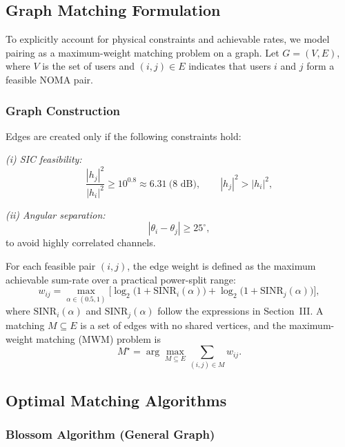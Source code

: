 \subsection{Graph Matching Formulation}

To explicitly account for physical constraints and achievable rates, we model pairing as a maximum-weight matching problem on a graph. Let $G=(V,E)$, where $V$ is the set of users and $(i,j)\in E$ indicates that users $i$ and $j$ form a feasible NOMA pair.

\subsubsection{Graph Construction}

Edges are created only if the following constraints hold:

\textit{(i) SIC feasibility:}
\begin{equation}
\frac{|h_j|^2}{|h_i|^2} \ge 10^{0.8} \approx 6.31 \ \text{(8 dB)}, 
\qquad |h_j|^2 > |h_i|^2 ,
\end{equation}

\textit{(ii) Angular separation:}
\begin{equation}
|\theta_i - \theta_j| \ge 25^\circ,
\end{equation}
to avoid highly correlated channels.

For each feasible pair $(i,j)$, the edge weight is defined as the maximum achievable sum-rate over a practical power-split range:
\begin{equation}
\label{eq:edge_weight}
w_{ij} = \max_{\alpha \in (0.5,1)} 
\Big[
\log_2\big(1+\mathrm{SINR}_i(\alpha)\big)
+
\log_2\big(1+\mathrm{SINR}_j(\alpha)\big)
\Big],
\end{equation}
where $\mathrm{SINR}_i(\alpha)$ and $\mathrm{SINR}_j(\alpha)$ follow the expressions in Section~III. A matching $M \subseteq E$ is a set of edges with no shared vertices, and the maximum-weight matching (MWM) problem is
\begin{equation}
\label{eq:mwm}
M^\star = \arg\max_{M \subseteq E} \sum_{(i,j) \in M} w_{ij}.
\end{equation}

\subsection{Optimal Matching Algorithms}

\subsubsection{Blossom Algorithm (General Graph)}

